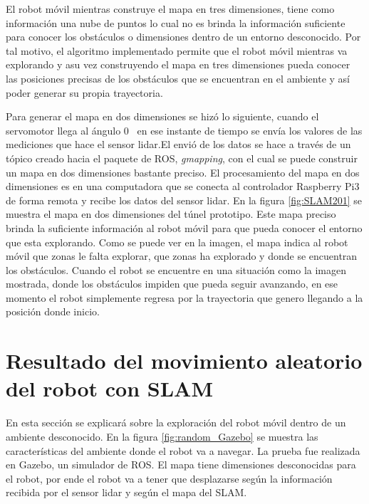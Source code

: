 El robot móvil mientras construye el mapa en tres dimensiones, tiene como información una nube 
de puntos lo cual no es brinda la información suficiente para conocer los obstáculos o 
dimensiones dentro de un entorno desconocido. Por tal motivo, el algoritmo implementado permite 
que el robot móvil mientras va explorando y asu vez construyendo el mapa en tres dimensiones 
pueda conocer las posiciones precisas de los obstáculos que se encuentran en el ambiente y así 
poder generar su propia trayectoria.

Para generar el mapa en dos dimensiones se hizó lo siguiente, cuando el servomotor llega al ángulo
0\grad~ en ese instante de tiempo se envía los valores de las mediciones que hace el sensor lidar.El
envió de los datos se hace a través de un tópico creado hacia el paquete de ROS, \textit{gmapping}, 
con el cual se puede construir un mapa en dos dimensiones bastante preciso. El procesamiento del 
mapa en dos dimensiones es en una computadora que se conecta al controlador Raspberry Pi3 de forma 
remota y recibe los datos del sensor lidar. En la figura \ref{fig:SLAM201} se muestra el mapa en 
dos dimensiones del túnel prototipo. Este mapa preciso brinda la suficiente información al robot  
móvil para que pueda conocer el entorno que esta explorando. Como se puede ver en la imagen, el 
mapa indica al robot móvil que zonas le falta explorar, que zonas ha explorado y donde se 
encuentran los obstáculos. Cuando el robot se encuentre en una situación como la imagen mostrada, 
donde los obstáculos impiden que pueda seguir avanzando, en ese momento el robot simplemente regresa 
por la trayectoria que genero llegando a la posición donde inicio.
 

\section{Resultado del movimiento aleatorio del robot con SLAM}

En esta sección se explicará sobre la exploración del robot móvil dentro de un ambiente 
desconocido. En la figura \ref{fig:random_Gazebo} se muestra las características del ambiente 
donde el robot va a navegar. La prueba fue realizada en Gazebo, un simulador de ROS. El mapa 
tiene dimensiones desconocidas para el robot, por ende el robot va a tener que desplazarse 
según la información recibida por el sensor lidar y según el mapa del SLAM.

